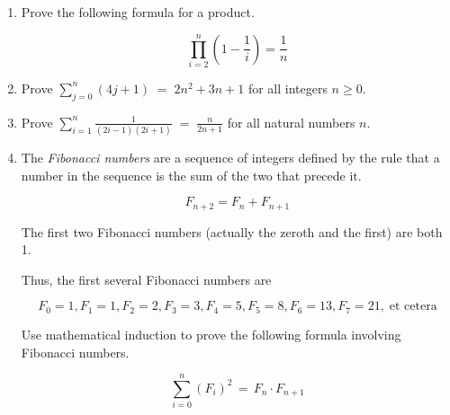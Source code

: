 \begin{enumerate}
{\begin{proof}
Adding $(-1)^{k} (k+1)^2$ to both sides gives

\begin{gather*} 
\sum_{i=1}^{k+1} (-1)^{i-1} i^2 \;= \; (-1)^{k-1} \frac{k(k+1)}{2} + (-1)^{k} (k+1)^2 \\
\;= \; (-1)^{k-1} \frac{k(k+1)}{2} - (-1)^{k-1} (k+1)^2 \\ 
\;= \; (-1)^{k-1} \left( \frac{k(k+1)}{2} -  \frac{2(k+1)^2}{2} \right) \\ 
\;= \; (-1)^{k} \left( \frac{2(k+1)^2}{2} - \frac{k(k+1)}{2} \right) \\
\;= \; (-1)^{k} \frac{(k+1)(2(k+1)-k)}{2} \\
\;= \; (-1)^{k} \frac{(k+1)(k+2)}{2} \\
\end{gather*}
\end{proof}
}

\wbvfill

\workbookpagebreak

\item Prove the following formula for a product.

\[ \prod_{i=2}^n \left(1 - \frac{1}{i}\right) =  \frac{1}{n} \]

\wbvfill


\item Prove $\displaystyle \sum_{j=0}^{n}(4j+1) \; = \; 2n^{2}+3n+1$ for all
integers $n \geq 0$.

\wbvfill

\workbookpagebreak

\item Prove $\displaystyle \sum_{i=1}^{n}\frac{1}{(2i-1)(2i+1)} \; = \; \frac{n}{2n+1}$ for all natural numbers $n$.

\wbvfill

\workbookpagebreak

\item The  \emph{Fibonacci numbers} are a sequence of integers defined by
the rule that a number in the sequence is the sum of the two that 
precede it.

\[ F_{n+2} = F_n + F_{n+1}  \]

\noindent The first two Fibonacci numbers (actually the zeroth and the first) 
are both 1.  

\noindent Thus, the first several Fibonacci numbers are

\[ F_0 = 1, F_1=1, F_2=2, F_3=3, F_4=5, F_5=8, F_6=13, F_7=21, \; \mbox{et cetera} \]

Use mathematical induction to prove the following formula involving
Fibonacci numbers.

\[ \sum_{i=0}^n (F_i)^2 \, = \, F_n \cdot F_{n+1} \]

\wbvfill

\workbookpagebreak

\end{enumerate}


